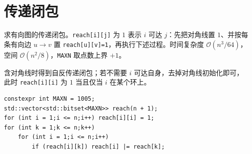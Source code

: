 \section{传递闭包}

求有向图的传递闭包。\texttt{reach[i][j]} 为 $1$ 表示 $i$ 可达 $j$：先把对角线置 $1$、并按每条有向边 $u\to v$ 置 \texttt{reach[u][v]=1}，再执行下述过程。时间复杂度 $\mathcal{O}(n^3/64)$，空间 $\mathcal{O}(n^2/8)$，\texttt{MAXN} 取点数上界 $+1$。

含对角线时得到自反传递闭包；若不需要 $i$ 可达自身，去掉对角线初始化即可，此时 \texttt{reach[i][i]} 为 $1$ 当且仅当 $i$ 在某个环上。

\begin{lstlisting}
constexpr int MAXN = 1005;
std::vector<std::bitset<MAXN>> reach(n + 1);
for (int i = 1;i <= n;i++) reach[i][i] = 1;
for (int k = 1;k <= n;k++)
    for (int i = 1;i <= n;i++)
        if (reach[i][k]) reach[i] |= reach[k];
\end{lstlisting}
